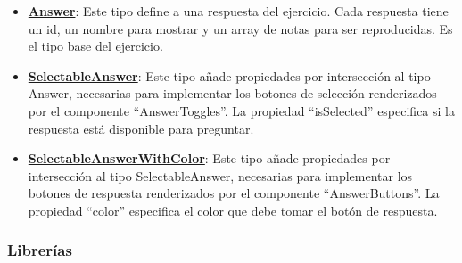 \documentclass[12pt,twoside,titlepage]{report}
\begin{document}
\begin{itemize}
    \begin{figure}[H]
        \centering
        \texttt{[image: Detalles de Implementación/Code/Types/Answer]}
        \caption{Tipo Answer.}
        \label{fig:Answer}
    \end{figure}

    Cada variante de ejercicio utiliza los tipos Answer, SelectableAnswer y SelectableAnswerWithColor. (Ver figura \ref{fig:Answer}).

    \item \href{https://github.com/alberttogoca/EarFit/blob/main/src/types/index.ts}{\textbf{Answer}}: Este tipo define a una respuesta del ejercicio. Cada respuesta tiene un id, un nombre para mostrar y un array de notas para ser reproducidas. Es el tipo base del ejercicio.
    \item \href{https://github.com/alberttogoca/EarFit/blob/main/src/types/index.ts}{\textbf{SelectableAnswer}}: Este tipo añade propiedades por intersección al tipo Answer, necesarias para implementar los botones de selección renderizados por el componente ``AnswerToggles''. La propiedad ``isSelected'' especifica si la respuesta está disponible para preguntar.
    \item \href{https://github.com/alberttogoca/EarFit/blob/main/src/types/index.ts}{\textbf{SelectableAnswerWithColor}}: Este tipo añade propiedades por intersección al tipo SelectableAnswer, necesarias para implementar los botones de respuesta renderizados por el componente ``AnswerButtons''. La propiedad ``color'' especifica el color que debe tomar el botón de respuesta.

\end{itemize}

\subsubsection{Librerías}
\label{sec:lib}
\end{document}
